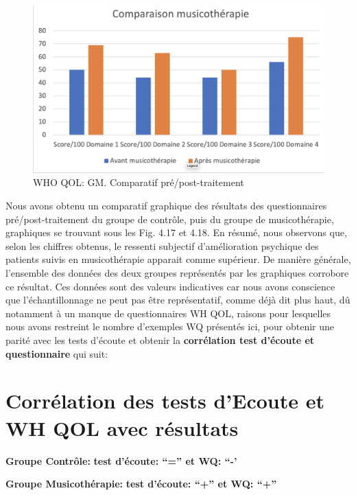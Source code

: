 \begin{figure}
\centering
\includegraphics[width=1.0\linewidth]{images/Compmusico.png}
\caption[Schéma du déroulement]{ WHO QOL: GM. Comparatif pré/post-traitement }

\end{figure}


Nous avons obtenu un comparatif graphique  des résultats des questionnaires
pré/post-traitement du groupe de contrôle, puis du groupe de musicothérapie,
graphiques se trouvant sous les Fig. 4.17 et 4.18.
       En résumé, nous observons que, selon les chiffres obtenus, le ressenti
       subjectif d'amélioration psychique
        des patients suivis en musicothérapie apparait comme
        supérieur.
        De manière générale, l'ensemble des données des deux groupes représentés
        par les graphiques corrobore ce résultat.
        Ces données sont des valeurs indicatives car nous avons conscience que l'échantillonnage ne
        peut pas être représentatif, comme déjà dit plus haut, dû
        notamment à un
        manque de
        questionnaires WH QOL, raisons pour lesquelles nous avons
        restreint le nombre d'exemples WQ présentés ici, pour obtenir
        une parité avec les tests d'écoute et obtenir la
        \textbf{corrélation test d'écoute et questionnaire} qui
        suit:

  \section{Corrélation des tests d'Ecoute et WH QOL avec résultats }
\textbf{Groupe Contrôle:} 	          \textbf{ test d'écoute: ``=''   et    WQ: ``-'}


\textbf{Groupe Musicothérapie:}     \textbf{test d'écoute: ``+''      et    WQ: ``+''}


